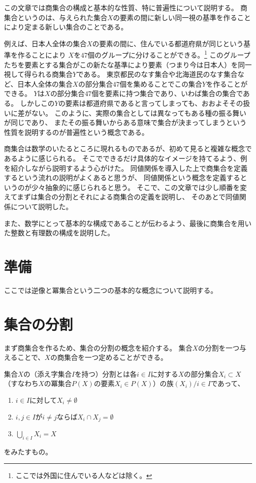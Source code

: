 この文章では商集合の構成と基本的な性質、特に普遍性について説明する。
商集合というのは、与えられた集合$X$の要素の間に新しい同一視の基準を作ることにより定まる新しい集合のことである。

例えば、日本人全体の集合$X$の要素の間に、住んでいる都道府県が同じという基準を作ることにより
$X$を$47$個のグループに分けることができる。\footnote{ここでは外国に住んでいる人などは除く。}
このグループたちを要素とする集合がこの新たな基準により要素（つまり今は日本人）を同一視して得られる商集合$Y$である。
東京都民のなす集合や北海道民のなす集合など、日本人全体の集合$X$の部分集合$47$個を集めることでこの集合$Y$を作ることができる。
$Y$は$X$の部分集合$47$個を要素に持つ集合であり、いわば集合の集合である。
しかしこの$Y$の要素は都道府県であると言ってしまっても、おおよそその扱いに差がない。
このように、実際の集合としては異なってもある種の振る舞いが同じであり、
またその振る舞いからある意味で集合が決まってしまうという性質を説明するのが普遍性という概念である。

商集合は数学のいたるところに現れるものであるが、初めて見ると複雑な概念であるように感じられる。
そこでできるだけ具体的なイメージを持てるよう、例を紹介しながら説明するよう心がけた。
同値関係を導入した上で商集合を定義するという流れの説明がよくあると思うが、
同値関係という概念を定義するというのが少々抽象的に感じられると思う。
そこで、この文章では少し順番を変えてまずは集合の分割とそれによる商集合の定義を説明し、
そのあとで同値関係について説明した。

また、数学にとって基本的な構成であることが伝わるよう、最後に商集合を用いた整数と有理数の構成を説明した。

\section{準備}

ここでは逆像と冪集合という二つの基本的な概念について説明する。



\section{集合の分割}

まず商集合を作るため、集合の分割の概念を紹介する。
集合$X$の分割を一つ与えることで、$X$の商集合を一つ定めることができる。

\begin{dfn}[集合の分割]
  集合$X$の（添え字集合$I$を持つ）分割とは各$i\in I$に対する$X$の部分集合$X_i\subset X$（すなわち$X$の冪集合$P(X)$の要素$X_i\in P(X)$）の族$(X_i)/{i\in I}$であって、
  \begin{enumerate}
  \item $i\in I$に対して$X_i\neq\emptyset$
  \item $i,j\in I$が$i\neq j$ならば$X_i\cap X_j=\emptyset$
  \item $\bigcup_{i\in I}X_i=X$
  \end{enumerate}
  をみたすもの。
\end{dfn}

